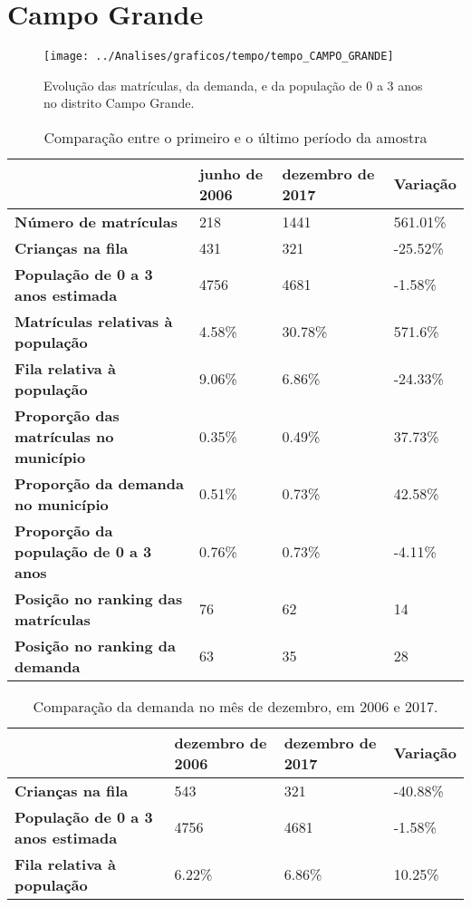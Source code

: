 \section{Campo Grande}
\begin{figure}[H]
\centering
\texttt{[image: ../Analises/graficos/tempo/tempo\_CAMPO\_GRANDE]}
\caption{Evolução das matrículas, da demanda, e da população de 0 a 3 anos no distrito Campo Grande.}
\end{figure}
\begin{table}[H]
\begin{tabular}{|l|l|l|l|}
\hline
\textbf{}                                      & \textbf{junho de 2006}       & \textbf{dezembro de 2017}    & \textbf{Variação} \\ \hline
\textbf{Número de matrículas}                  & 218 & 1441 & 561.01\% \\ \hline
\textbf{Crianças na fila}                      & 431 & 321 & -25.52\% \\ \hline
\textbf{População de 0 a 3 anos estimada}      & 4756 & 4681 & -1.58\% \\ \hline
\textbf{Matrículas relativas à população}      & 4.58\% & 30.78\% & 571.6\% \\ \hline
\textbf{Fila relativa à população}             & 9.06\% & 6.86\% & -24.33\% \\ \hline
\textbf{Proporção das matrículas no município} & 0.35\% & 0.49\% & 37.73\% \\ \hline
\textbf{Proporção da demanda no município}     & 0.51\% & 0.73\% & 42.58\% \\ \hline
\textbf{Proporção da população de 0 a 3 anos}  & 0.76\% & 0.73\% & -4.11\% \\ \hline
\textbf{Posição no ranking das matrículas}     & 76 & 62 & 14 \\ \hline
\textbf{Posição no ranking da demanda}         & 63 & 35 & 28 \\ \hline
\end{tabular}
\caption{Comparação entre o primeiro e o último período da amostra}
\end{table}
\begin{table}[H]
\begin{tabular}{|l|l|l|l|}
\hline
\textbf{}                                 & \textbf{dezembro de 2006} & \textbf{dezembro de 2017} & \textbf{Variação} \\ \hline
\textbf{Crianças na fila}                      & 543 & 321 & -40.88\% \\ \hline
\textbf{População de 0 a 3 anos estimada}      & 4756 & 4681 & -1.58\% \\ \hline
\textbf{Fila relativa à população}             & 6.22\% & 6.86\% & 10.25\% \\ \hline
\end{tabular}
\caption{Comparação da demanda no mês de dezembro, em 2006 e 2017.}
\end{table}
